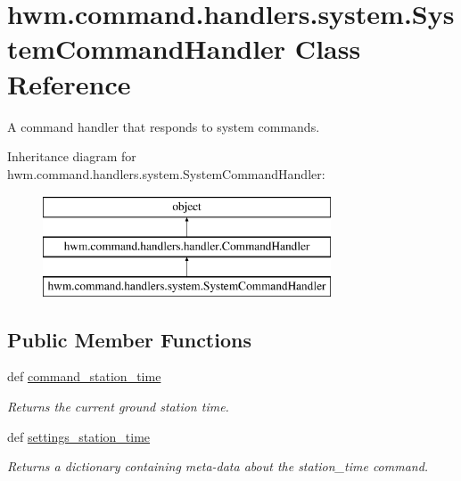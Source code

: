 \hypertarget{classhwm_1_1command_1_1handlers_1_1system_1_1_system_command_handler}{\section{hwm.\-command.\-handlers.\-system.\-System\-Command\-Handler Class Reference}
\label{classhwm_1_1command_1_1handlers_1_1system_1_1_system_command_handler}
}


A command handler that responds to system commands.  


Inheritance diagram for hwm.\-command.\-handlers.\-system.\-System\-Command\-Handler\-:\begin{figure}[H]
\begin{center}
\leavevmode
\includegraphics[height=3.000000cm]{classhwm_1_1command_1_1handlers_1_1system_1_1_system_command_handler}
\end{center}
\end{figure}
\subsection*{Public Member Functions}
\begin{DoxyCompactItemize}
\item 
def \hyperlink{classhwm_1_1command_1_1handlers_1_1system_1_1_system_command_handler_af269f2e618ae3be63b48ce79960bcc04}{command\-\_\-station\-\_\-time}
\begin{DoxyCompactList}\small\item\em Returns the current ground station time. \end{DoxyCompactList}\item 
def \hyperlink{classhwm_1_1command_1_1handlers_1_1system_1_1_system_command_handler_aac8f8424541b9c72cdda43ec6cbd6a1f}{settings\-\_\-station\-\_\-time}
\begin{DoxyCompactList}\small\item\em Returns a dictionary containing meta-\/data about the station\-\_\-time command. \end{DoxyCompactList}\end{DoxyCompactItemize}

